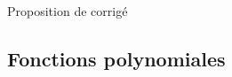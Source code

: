 
\vspace{0.1cm}
\begin{huge}
 Proposition de corrigé
\end{huge}

\subsection{Fonctions polynomiales}
\setcounter{thequestion}{0}
